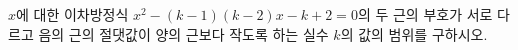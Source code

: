 \hspace*{2mm}\begin{minipage}[t]{\dimexpr\linewidth-2mm\relax}\vspace{0pt}
$x$에 대한 이차방정식 $x^2-(k-1)(k-2)x-k+2=0$의 두 근의 부호가 서로 다르고 음의 근의 절댓값이 양의 근보다 작도록 하는 실수 $k$의 값의 범위를 구하시오.\end{minipage}

